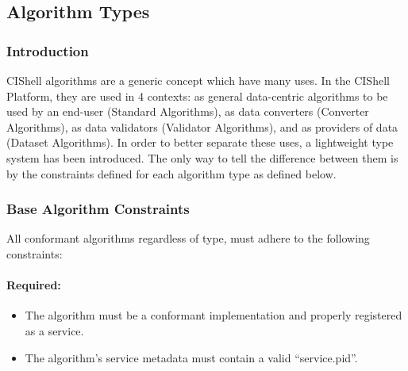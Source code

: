 %

\subsection{Algorithm Types}
\label{algConstraints}
\subsubsection{Introduction}

CIShell algorithms are a generic concept which have many uses. In the CIShell
Platform, they are used in 4 contexts: as general data-centric algorithms to be
used by an end-user (Standard Algorithms), as data converters (Converter
Algorithms), as data validators (Validator Algorithms), and as providers of data
(Dataset Algorithms). In order to better separate these uses, a lightweight type
system has been introduced. The only way to tell the difference between them is
by the constraints defined for each algorithm type as defined below.

\subsubsection{Base Algorithm Constraints}

All conformant algorithms regardless of type, must adhere to the following
constraints:

\paragraph*{Required:}
\begin{itemize}
  \item The algorithm must be a conformant 
  implementation and properly registered as a service.
  \item The algorithm's service metadata must contain a valid ``service.pid''.
\end{itemize}

